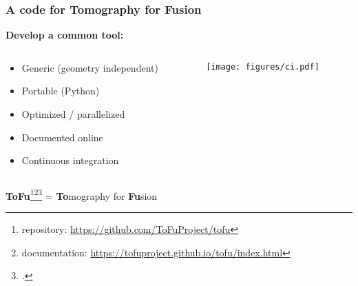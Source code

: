 \documentclass[10pt]{beamer}
\begin{document}
\begin{frame}
\frametitle{A code for Tomography for Fusion}
\textbf{Develop a common tool:}
\begin{columns}
\begin{column}{0.65\textwidth}
	\begin{itemize}
	\item Generic (geometry independent)
	\item Portable (Python)
	\item Optimized / parallelized
	\item Documented online
	\item Continuous integration
	\end{itemize}
\end{column}
\begin{column}{0.35\textwidth}
\vspace{-1cm}
\begin{center}
    	\texttt{[image: figures/ci.pdf]}
\end{center}
\end{column}
\end{columns}
\vspace{-0.9cm}

\begin{block}{}
	\begin{center}
	\alert{\textbf{ToFu}\footnote{repository: \url{https://github.com/ToFuProject/tofu}}\footnote{documentation: \url{https://tofuproject.github.io/tofu/index.html} }\footcite{didier2016}} = \alert{\textbf{To}mography for \textbf{Fu}sion}
	\end{center}
\vspace{-5mm} 
\end{block}
	
\end{frame}
\end{document}
